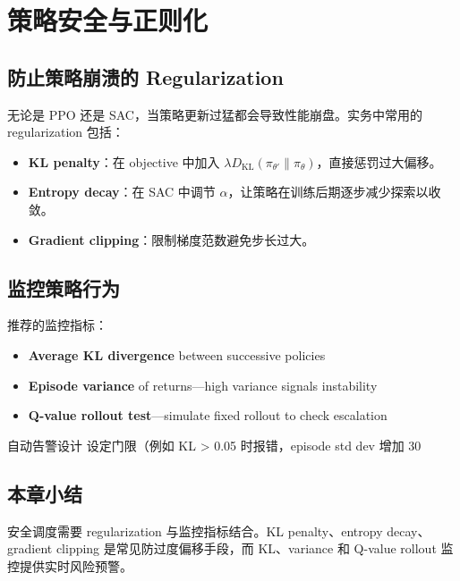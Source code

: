 \section{策略安全与正则化}

\subsection{防止策略崩溃的 Regularization}

无论是 PPO 还是 SAC，当策略更新过猛都会导致性能崩盘。实务中常用的 regularization 包括：

\begin{itemize}
    \item \textbf{KL penalty}：在 objective 中加入 $\lambda D_{\mathrm{KL}}(\pi_{\theta'}\|\pi_\theta)$，直接惩罚过大偏移。
    \item \textbf{Entropy decay}：在 SAC 中调节 $\alpha$，让策略在训练后期逐步减少探索以收敛。
    \item \textbf{Gradient clipping}：限制梯度范数避免步长过大。
\end{itemize}

\subsection{监控策略行为}

推荐的监控指标：

\begin{itemize}
    \item \textbf{Average KL divergence} between successive policies
    \item \textbf{Episode variance} of returns—high variance signals instability
    \item \textbf{Q-value rollout test}—simulate fixed rollout to check escalation
\end{itemize}

\begin{knowledgebox}{自动告警设计}
设定门限（例如 KL > 0.05 时报错，episode std dev 增加 30%
\end{knowledgebox}

\subsection{本章小结}

安全调度需要 regularization 与监控指标结合。KL penalty、entropy decay、gradient clipping 是常见防过度偏移手段，而 KL、variance 和 Q-value rollout 监控提供实时风险预警。

